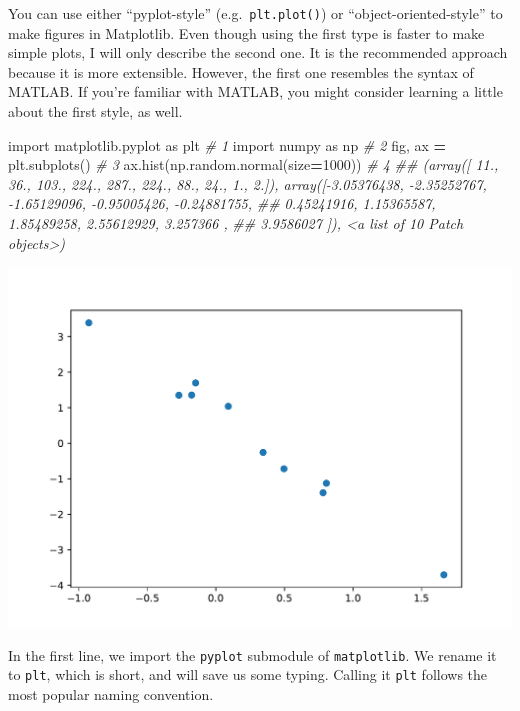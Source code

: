 \documentclass[
  12pt,
  krantz2]{krantz}
\makeatletter
\newenvironment{Shaded}{\begin{snugshade}}{\end{snugshade}}
\newcommand{\CommentTok}[1]{\textcolor[rgb]{0.37,0.37,0.37}{\textit{#1}}}
\newcommand{\DecValTok}[1]{\textcolor[rgb]{0.06,0.06,0.06}{#1}}
\newcommand{\ImportTok}[1]{#1}
\newcommand{\NormalTok}[1]{#1}
\newcommand{\OperatorTok}[1]{\textcolor[rgb]{0.43,0.43,0.43}{\textbf{#1}}}
\newenvironment{kframe}{%
\medskip{}
\setlength{\fboxsep}{.8em}
 \def\at@end@of@kframe{}%
 \ifinner\ifhmode%
  \def\at@end@of@kframe{\end{minipage}}%
  \begin{minipage}{\columnwidth}%
 \fi\fi%
 \def\FrameCommand##1{\hskip\@totalleftmargin \hskip-\fboxsep
 \colorbox{shadecolor}{##1}\hskip-\fboxsep
     \hskip-\linewidth \hskip-\@totalleftmargin \hskip\columnwidth}%
 \MakeFramed {\advance\hsize-\width
   \@totalleftmargin\z@ \linewidth\hsize
   \@setminipage}}%
 {\par\unskip\endMakeFramed%
 \at@end@of@kframe}
\renewenvironment{Shaded}{\begin{kframe}}{\end{kframe}}
\makeatother
\begin{document}
You can use either ``pyplot-style'' (e.g.~\texttt{plt.plot()}) or ``object-oriented-style'' to make figures in Matplotlib. Even though using the first type is faster to make simple plots, I will only describe the second one. It is the recommended approach because it is more extensible. However, the first one resembles the syntax of MATLAB. If you're familiar with MATLAB, you might consider learning a little about the first style, as well.

\begin{Shaded}
\begin{Highlighting}[]
\ImportTok{import}\NormalTok{ matplotlib.pyplot }\ImportTok{as}\NormalTok{ plt       }\CommentTok{\# 1}
\ImportTok{import}\NormalTok{ numpy }\ImportTok{as}\NormalTok{ np                    }\CommentTok{\# 2}
\NormalTok{fig, ax }\OperatorTok{=}\NormalTok{ plt.subplots()              }\CommentTok{\# 3}
\NormalTok{ax.hist(np.random.normal(size}\OperatorTok{=}\DecValTok{1000}\NormalTok{))  }\CommentTok{\# 4}
\CommentTok{\#\# (array([ 11.,  36., 103., 224., 287., 224.,  88.,  24.,   1.,   2.]), array([{-}3.05376438, {-}2.35252767, {-}1.65129096, {-}0.95005426, {-}0.24881755,}
\CommentTok{\#\#         0.45241916,  1.15365587,  1.85489258,  2.55612929,  3.257366  ,}
\CommentTok{\#\#         3.9586027 ]), \textless{}a list of 10 Patch objects\textgreater{})}
\end{Highlighting}
\end{Shaded}

\includegraphics[width=0.8\linewidth]{r_and_python_book_files/figure-latex/unnamed-chunk-230-1}

In the first line, we import the \texttt{pyplot} submodule of \texttt{matplotlib}. We rename it to \texttt{plt}, which is short, and will save us some typing. Calling it \texttt{plt} follows the most popular naming convention.
\end{document}
